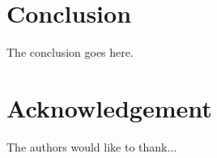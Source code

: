 \documentclass[conference]{IEEEtran}
\begin{document}
\section{Conclusion}
The conclusion goes here.

\section*{Acknowledgement}


The authors would like to thank...



%
%
%

\printbibliography




\end{document}

